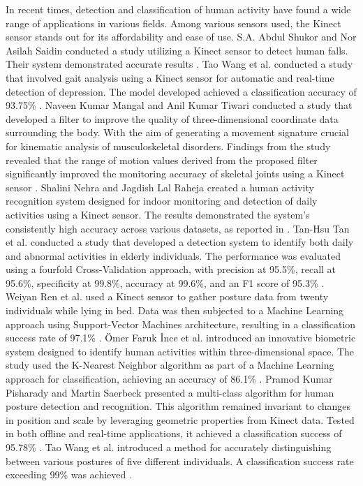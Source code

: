       In recent times, detection and classification of human activity have found a wide range of applications in various fields. Among various sensors used, the Kinect sensor stands out for its affordability and ease of use. S.A. Abdul Shukor and Nor Asilah Saidin conducted a study utilizing a Kinect sensor to detect human falls. Their system demonstrated accurate results \cite{saidin_analysis_2020}. 
      Tao Wang et al. conducted a study that involved gait analysis using a Kinect sensor for automatic and real-time detection of depression. The model developed achieved a classification accuracy of 93.75\% \cite{wang_gait_2021}.
      Naveen Kumar Mangal and Anil Kumar Tiwari conducted a study that developed a filter to improve the quality of three-dimensional coordinate data surrounding the body. With the aim of generating a movement signature crucial for kinematic analysis of musculoskeletal disorders. Findings from the study revealed that the range of motion values derived from the proposed filter significantly improved the monitoring accuracy of skeletal joints using a Kinect sensor \cite{mangal_kinect_2020}. 
      Shalini Nehra and Jagdish Lal Raheja created a human activity recognition system designed for indoor monitoring and detection of daily activities using a Kinect sensor. The results demonstrated the system's consistently high accuracy across various datasets, as reported in \cite{nehra_unobtrusive_2020}.
      Tan-Hsu Tan et al. conducted a study that developed a detection system to identify both daily and abnormal activities in elderly individuals. The performance was evaluated using a fourfold Cross-Validation approach, with precision at 95.5\%, recall at 95.6\%, specificity at 99.8\%, accuracy at 99.6\%, and an F1 score of 95.3\% \cite{tan_activity_2020}. 
      Weiyan Ren et al. used a Kinect sensor to gather posture data from twenty individuals while lying in bed. Data was then subjected to a Machine Learning approach using Support-Vector Machines architecture, resulting in a classification success rate of 97.1\% \cite{ren_human_2020}.
      \"{O}mer Faruk \.{I}nce et al. introduced an innovative biometric system designed to identify human activities within three-dimensional space. The study used the K-Nearest Neighbor algorithm as part of a Machine Learning approach for classification, achieving an accuracy of 86.1\% \cite{ince_human_2020}.
      Pramod Kumar Pisharady and Martin Saerbeck presented a multi-class algorithm for human posture detection and recognition. This algorithm remained invariant to changes in position and scale by leveraging geometric properties from Kinect data. Tested in both offline and real-time applications, it achieved a classification success of 95.78\% \cite{pisharady_kinect_2013}.
      Tao Wang et al. introduced a method for accurately distinguishing between various postures of five different individuals. A classification success rate exceeding 99\% was achieved \cite{wang_gait_2021}.


